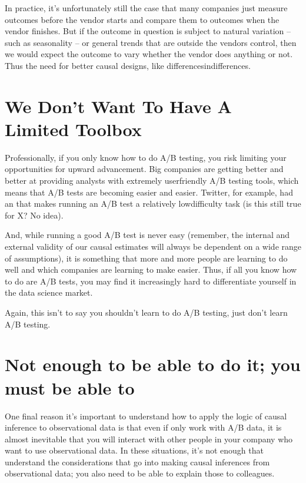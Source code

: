 \documentclass[letterpaper,10pt,english]{jupyterBook}
\begin{document}
\sphinxAtStartPar
In practice, it’s unfortunately still the case that many companies just measure outcomes before the vendor starts and compare them to outcomes when the vendor finishes. But if the outcome in question is subject to natural variation – such as seasonality – or general trends that are outside the vendors control, then we would expect the outcome to vary whether the vendor does anything or not. Thus the need for better causal designs, like differences\sphinxhyphen{}in\sphinxhyphen{}differences.


\section{We Don’t Want To Have A Limited Toolbox}
\label{\detokenize{30_questions/50_causal_beyond_ab:we-don-t-want-to-have-a-limited-toolbox}}
\sphinxAtStartPar
Professionally, if you only know how to do A/B testing, you risk limiting your opportunities for upward advancement. Big companies are getting better and better at providing analysts with extremely user\sphinxhyphen{}friendly A/B testing tools, which means that A/B tests are becoming easier and easier. Twitter, for example, had an  that makes running an A/B test a relatively low\sphinxhyphen{}difficulty task (is this still true for X? No idea).

\sphinxAtStartPar
And, while running a good A/B test is never easy (remember, the internal and external validity of our causal estimates will always be dependent on a wide range of assumptions), it is something that more and more people are learning to do well and which companies are learning to make easier. Thus, if all you know how to do are A/B tests, you may find it increasingly hard to differentiate yourself in the data science market.

\sphinxAtStartPar
Again, this isn’t to say you shouldn’t learn to do A/B testing, just don’t  learn A/B testing.


\section{Not enough to be able to do it; you must be able to }
\label{\detokenize{30_questions/50_causal_beyond_ab:not-enough-to-be-able-to-do-it-you-must-be-able-to-explain-it}}
\sphinxAtStartPar
One final reason it’s important to understand how to apply the logic of causal inference to observational data is that even if  only work with A/B data, it is almost inevitable that you will interact with other people in your company who want to use observational data. In these situations, it’s not enough that  understand the considerations that go into making causal inferences from observational data; you also need to be able to explain those to colleagues.
\end{document}
